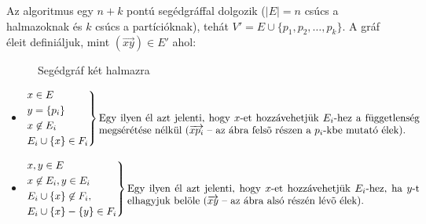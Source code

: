 Az algoritmus egy $n+k$ pontú segédgráffal dolgozik ($|E|=n$ csúcs a halmazoknak
és $k$ csúcs a partícióknak), tehát $V' = E \cup \{p_1, p_2, \ldots, p_k\}$. A
gráf éleit definiáljuk, mint $(\overrightarrow{xy}) \in E'$ ahol:

\begin{figure}[htbp]
\caption{Segédgráf két halmazra}
\label{fig:MPP_graf}
\centering {} 
\end{figure}


\begin{itemize}
  \item  $\begin{rcases}
  x \in E \\
  y = \{ p_i \}  \\
  x \not \in E_i\\
  E_i \cup  \{x\}  \in  F_i \end{rcases}
  \parbox[t]{11cm}{Egy ilyen él azt jelenti, hogy $x$-et hozzávehetjük $E_i$-hez
   a függetlenség megsérétése nélkül ($\overrightarrow{xp_i}$ -- az ábra felsõ
  részen a $p_i$-kbe mutató élek).}$
  \item $\begin{rcases}
  x,y \in E \\
  x \not\in E_i, y \in E_i\\
   E_i \cup \{x\} \not\in F_i,\\ 
   E_i \cup \{x\} - \{y\} \in F_i
  \end{rcases} \parbox[t]{10cm}{Egy ilyen él azt jelenti, hogy $x$-et
  hozzávehetjük $E_i$-hez, ha $y$-t elhagyjuk belöle ($\overrightarrow{xy}$ --
  az ábra alsó részén lévõ élek).}$
\end{itemize}

